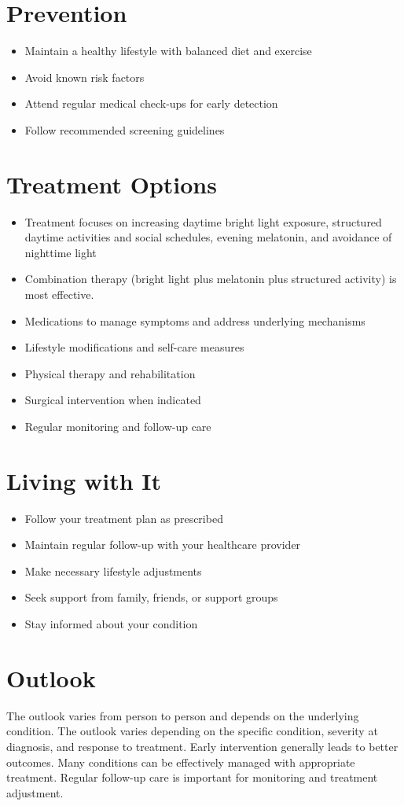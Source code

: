 \section{Prevention}
\begin{itemize}[noitemsep]
  \item Maintain a healthy lifestyle with balanced diet and exercise
  \item Avoid known risk factors
  \item Attend regular medical check-ups for early detection
  \item Follow recommended screening guidelines
\end{itemize}
\section{Treatment Options}
\begin{itemize}[noitemsep]
  \item Treatment focuses on increasing daytime bright light exposure, structured daytime activities and social schedules, evening melatonin, and avoidance of nighttime light
  \item Combination therapy (bright light plus melatonin plus structured activity) is most effective.
  \item Medications to manage symptoms and address underlying mechanisms
  \item Lifestyle modifications and self-care measures
  \item Physical therapy and rehabilitation
  \item Surgical intervention when indicated
  \item Regular monitoring and follow-up care
\end{itemize}
\section{Living with It}
\begin{itemize}[noitemsep]
  \item Follow your treatment plan as prescribed
  \item Maintain regular follow-up with your healthcare provider
  \item Make necessary lifestyle adjustments
  \item Seek support from family, friends, or support groups
  \item Stay informed about your condition
\end{itemize}
\section{Outlook}
The outlook varies from person to person and depends on the underlying condition. The outlook varies depending on the specific condition, severity at diagnosis, and response to treatment. Early intervention generally leads to better outcomes. Many conditions can be effectively managed with appropriate treatment. Regular follow-up care is important for monitoring and treatment adjustment.
